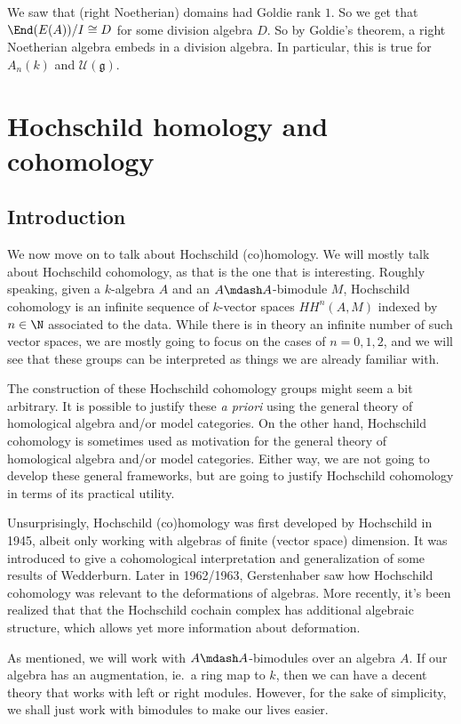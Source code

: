 \documentclass[a4paper]{article}
\begin{document}
We saw that (right Noetherian) domains had Goldie rank $1$. So we get that $\End(E(A))/I \cong D$ for some division algebra $D$. So by Goldie's theorem, a right Noetherian algebra embeds in a division algebra. In particular, this is true for $A_n(k)$ and $\mathcal{U}(\mathfrak{g})$.

\section{Hochschild homology and cohomology}
\subsection{Introduction}
We now move on to talk about Hochschild (co)homology. We will mostly talk about Hochschild cohomology, as that is the one that is interesting. Roughly speaking, given a $k$-algebra $A$ and an $A\mdash A$-bimodule $M$, Hochschild cohomology is an infinite sequence of $k$-vector spaces $HH^n(A, M)$ indexed by $n \in \N$ associated to the data. While there is in theory an infinite number of such vector spaces, we are mostly going to focus on the cases of $n = 0, 1, 2$, and we will see that these groups can be interpreted as things we are already familiar with.

The construction of these Hochschild cohomology groups might seem a bit arbitrary. It is possible to justify these \emph{a priori} using the general theory of homological algebra and/or model categories. On the other hand, Hochschild cohomology is sometimes used as motivation for the general theory of homological algebra and/or model categories. Either way, we are not going to develop these general frameworks, but are going to justify Hochschild cohomology in terms of its practical utility.

Unsurprisingly, Hochschild (co)homology was first developed by Hochschild in 1945, albeit only working with algebras of finite (vector space) dimension. It was introduced to give a cohomological interpretation and generalization of some results of Wedderburn. Later in 1962/1963, Gerstenhaber saw how Hochschild cohomology was relevant to the deformations of algebras. More recently, it's been realized that that the Hochschild cochain complex has additional algebraic structure, which allows yet more information about deformation.

As mentioned, we will work with $A\mdash A$-bimodules over an algebra $A$. If our algebra has an augmentation, ie.\ a ring map to $k$, then we can have a decent theory that works with left or right modules. However, for the sake of simplicity, we shall just work with bimodules to make our lives easier.
\end{document}
